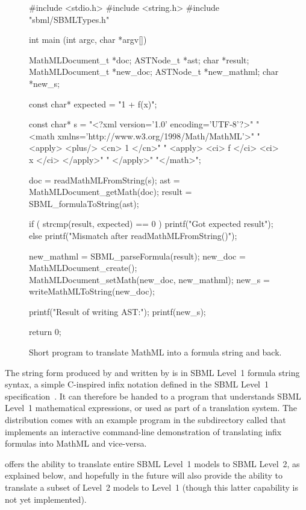 \documentclass{sbmlmanual}
\begin{document}
\begin{figure}[b]
  \begin{codeVerbatim}
#include <stdio.h>
#include <string.h>
#include "sbml/SBMLTypes.h"

int
main (int argc, char *argv[])
{
    MathMLDocument_t *doc;
    ASTNode_t        *ast;
    char             *result;
    MathMLDocument_t *new_doc;
    ASTNode_t        *new_mathml;
    char             *new_s;

    const char* expected = "1 + f(x)";

    const char* s = "<?xml version='1.0' encoding='UTF-8'?>"
        "<math xmlns='http://www.w3.org/1998/Math/MathML'>"
        "  <apply> <plus/> <cn> 1 </cn>"
        "                  <apply> <ci> f </ci> <ci> x </ci> </apply>"
        "  </apply>"
        "</math>";

    doc    = readMathMLFromString(s);
    ast    = MathMLDocument_getMath(doc);
    result = SBML_formulaToString(ast);

    if ( strcmp(result, expected) == 0 ) 
    {
        printf("Got expected result\n");
    }
    else
    {
        printf("Mismatch after readMathMLFromString()\n");
    }

    new_mathml = SBML_parseFormula(result);
    new_doc    = MathMLDocument_create();
    MathMLDocument_setMath(new_doc, new_mathml);
    new_s      = writeMathMLToString(new_doc);

    printf("Result of writing AST:\n");
    printf(new_s);

    return 0;
}
  \end{codeVerbatim}
  \caption{Short program to translate MathML into a formula string and back.}
  \label{fig:eg-round-trip}
\end{figure}

The string form produced by  and written by
 is in SBML Level~1 formula string syntax, a
simple C-inspired infix notation defined in the SBML Level~1
specification~\cite{hucka_2001b}.  It can therefore be handed to a program
that understands SBML Level~1 mathematical expressions, or used as part of
a translation system.  The \libsbml{} distribution comes with an example
program in the  subdirectory called 
that implements an interactive command-line demonstration of translating
infix formulas into MathML and vice-versa.

\libsbml{} offers the ability to translate entire SBML Level~1 models to
SBML Level~2, as explained below, and hopefully in the future will also
provide the ability to translate a subset of Level~2 models to Level~1
(though this latter capability is not yet implemented).
\end{document}
